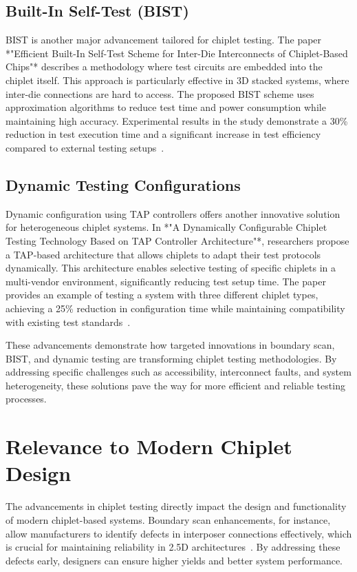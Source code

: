 \documentclass[acmtog, 12pt]{acmart}
\begin{document}
\subsection*{Built-In Self-Test (BIST)}
BIST is another major advancement tailored for chiplet testing. The paper *"Efficient Built-In Self-Test Scheme for Inter-Die Interconnects of Chiplet-Based Chips"* describes a methodology where test circuits are embedded into the chiplet itself. This approach is particularly effective in 3D stacked systems, where inter-die connections are hard to access. The proposed BIST scheme uses approximation algorithms to reduce test time and power consumption while maintaining high accuracy. Experimental results in the study demonstrate a 30\% reduction in test execution time and a significant increase in test efficiency compared to external testing setups~\cite{10766679}.

\subsection*{Dynamic Testing Configurations}
Dynamic configuration using TAP controllers offers another innovative solution for heterogeneous chiplet systems. In *"A Dynamically Configurable Chiplet Testing Technology Based on TAP Controller Architecture"*, researchers propose a TAP-based architecture that allows chiplets to adapt their test protocols dynamically. This architecture enables selective testing of specific chiplets in a multi-vendor environment, significantly reducing test setup time. The paper provides an example of testing a system with three different chiplet types, achieving a 25\% reduction in configuration time while maintaining compatibility with existing test standards~\cite{9824550}.

These advancements demonstrate how targeted innovations in boundary scan, BIST, and dynamic testing are transforming chiplet testing methodologies. By addressing specific challenges such as accessibility, interconnect faults, and system heterogeneity, these solutions pave the way for more efficient and reliable testing processes.



\section*{Relevance to Modern Chiplet Design}

The advancements in chiplet testing directly impact the design and functionality of modern chiplet-based systems. Boundary scan enhancements, for instance, allow manufacturers to identify defects in interposer connections effectively, which is crucial for maintaining reliability in 2.5D architectures~\cite{10365967}. By addressing these defects early, designers can ensure higher yields and better system performance.
\end{document}
